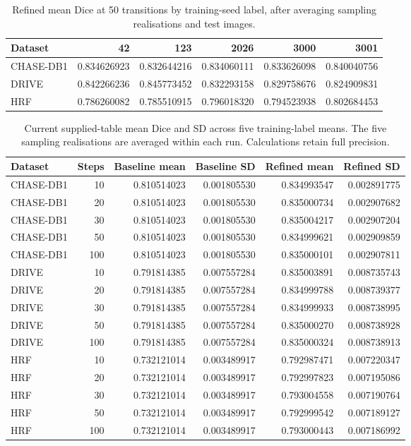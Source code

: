 \documentclass[jimaging,article,submit,pdftex,moreauthors]{Definitions/mdpi}%
\begin{document}
\begin{table}[htbp]
\centering
\caption{Refined mean Dice at 50 transitions by training-seed label, after averaging sampling realisations and test images.}
\label{tab:paired_five_seed_means}
\scriptsize
\begin{tabular}{lrrrrr}
\toprule
Dataset & 42 & 123 & 2026 & 3000 & 3001 \\
\midrule
CHASE-DB1 & 0.834626923 & 0.832644216 & 0.834060111 & 0.833626098 & 0.840040756 \\
DRIVE & 0.842266236 & 0.845773452 & 0.832293158 & 0.829758676 & 0.824909831 \\
HRF & 0.786260082 & 0.785510915 & 0.796018320 & 0.794523938 & 0.802684453 \\
\bottomrule
\end{tabular}
\end{table}

\begin{table}[htbp]
\centering
\caption{Current supplied-table mean Dice and SD across five training-label means. The five sampling realisations are averaged within each run. Calculations retain full precision.}
\label{tab:uploaded_step_mean_sd}
\scriptsize
\begin{tabular}{lrrrrr}
\toprule
Dataset & Steps & Baseline mean & Baseline SD & Refined mean & Refined SD \\
\midrule
CHASE-DB1 & 10 & 0.810514023 & 0.001805530 & 0.834993547 & 0.002891775 \\
CHASE-DB1 & 20 & 0.810514023 & 0.001805530 & 0.835000734 & 0.002907682 \\
CHASE-DB1 & 30 & 0.810514023 & 0.001805530 & 0.835004217 & 0.002907204 \\
CHASE-DB1 & 50 & 0.810514023 & 0.001805530 & 0.834999621 & 0.002909859 \\
CHASE-DB1 & 100 & 0.810514023 & 0.001805530 & 0.835000101 & 0.002907811 \\
DRIVE & 10 & 0.791814385 & 0.007557284 & 0.835003891 & 0.008735743 \\
DRIVE & 20 & 0.791814385 & 0.007557284 & 0.834999788 & 0.008739377 \\
DRIVE & 30 & 0.791814385 & 0.007557284 & 0.834999933 & 0.008738995 \\
DRIVE & 50 & 0.791814385 & 0.007557284 & 0.835000270 & 0.008738928 \\
DRIVE & 100 & 0.791814385 & 0.007557284 & 0.835000324 & 0.008738913 \\
HRF & 10 & 0.732121014 & 0.003489917 & 0.792987471 & 0.007220347 \\
HRF & 20 & 0.732121014 & 0.003489917 & 0.792997823 & 0.007195086 \\
HRF & 30 & 0.732121014 & 0.003489917 & 0.793004558 & 0.007190764 \\
HRF & 50 & 0.732121014 & 0.003489917 & 0.792999542 & 0.007189127 \\
HRF & 100 & 0.732121014 & 0.003489917 & 0.793000443 & 0.007186992 \\
\bottomrule
\end{tabular}
\end{table}
\end{document}

